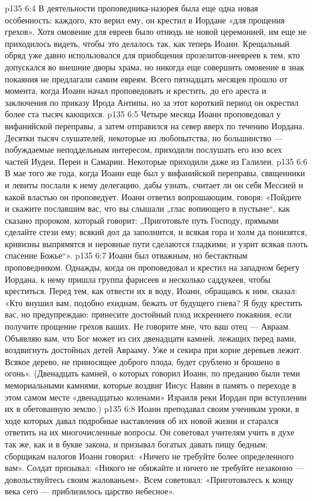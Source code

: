 \vs p135 6:4 В деятельности проповедника\hyp{}назорея была еще одна новая особенность: каждого, кто верил ему, он крестил в Иордане «для прощения грехов». Хотя омовение для евреев было отнюдь не новой церемонией, им еще не приходилось видеть, чтобы это делалось так, как теперь Иоанн. Крещальный обряд уже давно использовался для приобщения прозелитов\hyp{}неевреев к тем, кто допускался во внешние дворы храма, но никогда еще совершить омовение в знак покаяния не предлагали самим евреям. Всего пятнадцать месяцев прошло от момента, когда Иоанн начал проповедовать и крестить, до его ареста и заключения по приказу Ирода Антипы, но за этот короткий период он окрестил более ста тысяч кающихся.
\vs p135 6:5 Четыре месяца Иоанн проповедовал у вифанийской переправы, а затем отправился на север вверх по течению Иордана. Десятки тысяч слушателей, некоторые из любопытства, но большинство --- побуждаемые неподдельным интересом, приходили послушать его изо всех частей Иудеи, Переи и Самарии. Некоторые приходили даже из Галилеи.
\vs p135 6:6 В мае того же года, когда Иоанн еще был у вифанийской переправы, священники и левиты послали к нему делегацию, дабы узнать, считает ли он себя Мессией и какой властью он проповедует. Иоанн ответил вопрошающим, говоря: «Пойдите и скажите пославшим вас, что вы слышали „глас вопиющего в пустыне“, как сказано пророком, который говорит: „Приготовьте путь Господу, прямыми сделайте стези ему; всякий дол да заполнится, и всякая гора и холм да понизятся, кривизны выпрямятся и неровные пути сделаются гладкими; и узрит всякая плоть спасение Божье“».
\vs p135 6:7 Иоанн был отважным, но бестактным проповедником. Однажды, когда он проповедовал и крестил на западном берегу Иордана, к нему пришла группа фарисеев и несколько саддукеев, чтобы креститься. Перед тем, как отвести их в воду, Иоанн, обращаясь к ним, сказал: «Кто внушил вам, подобно ехиднам, бежать от будущего гнева? Я буду крестить вас, но предупреждаю: принесите достойный плод искреннего покаяния, если получите прощение грехов ваших. Не говорите мне, что ваш отец --- Авраам. Объявляю вам, что Бог может из сих двенадцати камней, лежащих перед вами, воздвигнуть достойных детей Аврааму. Уже и секира при корне деревьев лежит. Всякое дерево, не приносящее доброго плода, будет срублено и брошено в огонь». (Двенадцать камней, о которых говорил Иоанн, по преданию были теми мемориальными камнями, которые воздвиг Иисус Навин в память о переходе в этом самом месте «двенадцатью коленами» Израиля реки Иордан при вступлении их в обетованную землю.)
\vs p135 6:8 Иоанн преподавал своим ученикам уроки, в ходе которых давал подробные наставления об их новой жизни и старался ответить на их многочисленные вопросы. Он советовал учителям учить в духе так же, как и в букве закона, и призывал богатых давать пищу бедным; сборщикам налогов Иоанн говорил: «Ничего не требуйте более определенного вам». Солдат призывал: «Никого не обижайте и ничего не требуйте незаконно --- довольствуйтесь своим жалованьем». Всем советовал: «Приготовьтесь к концу века сего --- приблизилось царство небесное».
